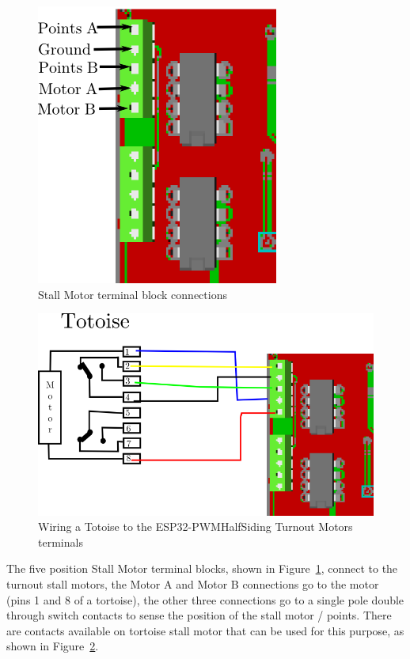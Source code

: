 \begin{figure}[hbpt]\begin{centering}%
\includegraphics{ESP32-PWMHalfSidingTurnoutMotorsFig.png}
\caption{Stall Motor terminal block connections}
\label{fig:ESP32-PWMHalfSidingTurnoutMotorsFig}
\end{centering}\end{figure}
\begin{figure}[hbpt]\begin{centering}%
\includegraphics{ESP32-PWMHalfSidingTotoiseWiring.png}
\caption{Wiring a Totoise to the ESP32-PWMHalfSiding Turnout Motors terminals}
\label{fig:ESP32-PWMHalfSidingTotoiseWiring}
\end{centering}\end{figure}
The five position Stall Motor terminal blocks, shown in 
Figure~\ref{fig:ESP32-PWMHalfSidingTurnoutMotorsFig}, connect to the turnout 
stall motors, the Motor A and Motor B connections go to the motor (pins 1 and 
8 of a tortoise), the other three connections go to a single pole double 
through switch contacts to sense the position of the stall motor / points. 
There are contacts available on tortoise stall motor that can be used for this 
purpose, as shown in Figure~\ref{fig:ESP32-PWMHalfSidingTotoiseWiring}.

